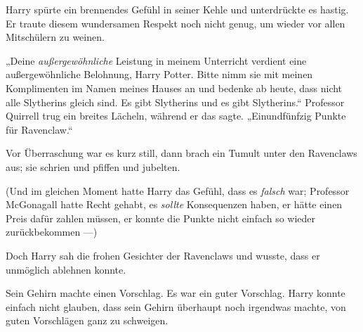 Harry spürte ein brennendes Gefühl in seiner Kehle und unterdrückte es hastig. Er traute diesem wundersamen Respekt noch nicht genug, um wieder vor allen Mitschülern zu weinen.

„Deine \emph{außergewöhnliche} Leistung in meinem Unterricht verdient eine außergewöhnliche Belohnung, Harry Potter. Bitte nimm sie mit meinen Komplimenten im Namen meines Hauses an und bedenke ab heute, dass nicht alle Slytherins gleich sind. Es gibt Slytherins und es gibt Slytherins.“ Professor Quirrell trug ein breites Lächeln, während er das sagte.
„Einundfünfzig Punkte für Ravenclaw.“

Vor Überraschung war es kurz still, dann brach ein Tumult unter den Ravenclaws aus; sie schrien und pfiffen und jubelten.

(Und im gleichen Moment hatte Harry das Gefühl, dass es \emph{falsch} war; Professor McGonagall hatte Recht gehabt, es \emph{sollte} Konsequenzen haben, er hätte einen Preis dafür zahlen müssen, er konnte die Punkte nicht einfach so wieder zurückbekommen —)

Doch Harry sah die frohen Gesichter der Ravenclaws und wusste, dass er unmöglich ablehnen konnte.

Sein Gehirn machte einen Vorschlag. Es war ein guter Vorschlag. Harry konnte einfach nicht glauben, dass sein Gehirn überhaupt noch irgendwas machte, von guten Vorschlägen ganz zu schweigen.

